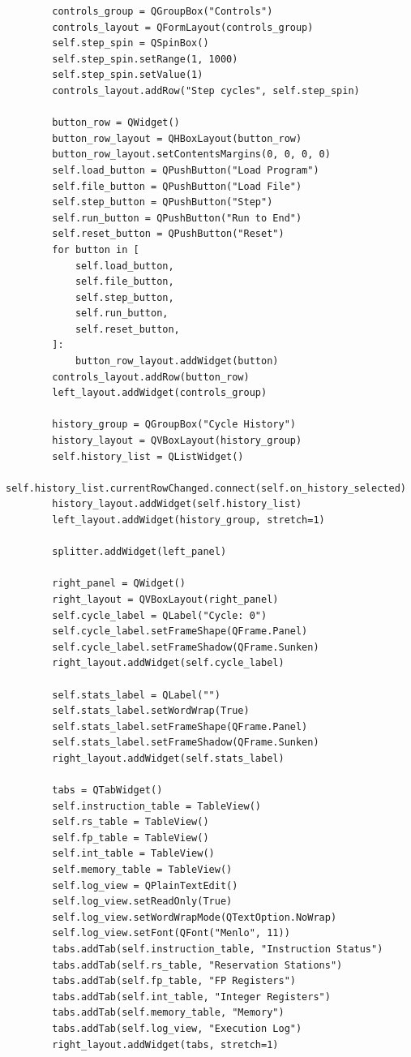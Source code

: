 \documentclass[12pt,a4paper]{ctexart}
\begin{document}
\begin{lstlisting}
        controls_group = QGroupBox("Controls")
        controls_layout = QFormLayout(controls_group)
        self.step_spin = QSpinBox()
        self.step_spin.setRange(1, 1000)
        self.step_spin.setValue(1)
        controls_layout.addRow("Step cycles", self.step_spin)

        button_row = QWidget()
        button_row_layout = QHBoxLayout(button_row)
        button_row_layout.setContentsMargins(0, 0, 0, 0)
        self.load_button = QPushButton("Load Program")
        self.file_button = QPushButton("Load File")
        self.step_button = QPushButton("Step")
        self.run_button = QPushButton("Run to End")
        self.reset_button = QPushButton("Reset")
        for button in [
            self.load_button,
            self.file_button,
            self.step_button,
            self.run_button,
            self.reset_button,
        ]:
            button_row_layout.addWidget(button)
        controls_layout.addRow(button_row)
        left_layout.addWidget(controls_group)

        history_group = QGroupBox("Cycle History")
        history_layout = QVBoxLayout(history_group)
        self.history_list = QListWidget()
        self.history_list.currentRowChanged.connect(self.on_history_selected)
        history_layout.addWidget(self.history_list)
        left_layout.addWidget(history_group, stretch=1)

        splitter.addWidget(left_panel)

        right_panel = QWidget()
        right_layout = QVBoxLayout(right_panel)
        self.cycle_label = QLabel("Cycle: 0")
        self.cycle_label.setFrameShape(QFrame.Panel)
        self.cycle_label.setFrameShadow(QFrame.Sunken)
        right_layout.addWidget(self.cycle_label)

        self.stats_label = QLabel("")
        self.stats_label.setWordWrap(True)
        self.stats_label.setFrameShape(QFrame.Panel)
        self.stats_label.setFrameShadow(QFrame.Sunken)
        right_layout.addWidget(self.stats_label)

        tabs = QTabWidget()
        self.instruction_table = TableView()
        self.rs_table = TableView()
        self.fp_table = TableView()
        self.int_table = TableView()
        self.memory_table = TableView()
        self.log_view = QPlainTextEdit()
        self.log_view.setReadOnly(True)
        self.log_view.setWordWrapMode(QTextOption.NoWrap)
        self.log_view.setFont(QFont("Menlo", 11))
        tabs.addTab(self.instruction_table, "Instruction Status")
        tabs.addTab(self.rs_table, "Reservation Stations")
        tabs.addTab(self.fp_table, "FP Registers")
        tabs.addTab(self.int_table, "Integer Registers")
        tabs.addTab(self.memory_table, "Memory")
        tabs.addTab(self.log_view, "Execution Log")
        right_layout.addWidget(tabs, stretch=1)


\end{lstlisting}
\end{document}
